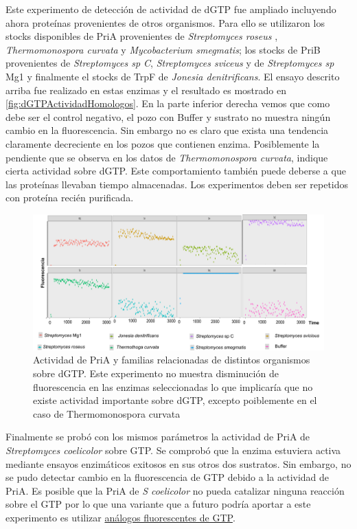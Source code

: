 \documentclass[12pt,twoside]{reedthesis}
\begin{document}
  Este experimento de detección de actividad de dGTP fue ampliado
  incluyendo ahora proteínas provenientes de otros organismos. Para ello
  se utilizaron los stocks disponibles de PriA provenientes de
  \emph{Streptomyces roseus} , \emph{Thermomonospora curvata} y
  \emph{Mycobacterium smegmatis}; los stocks de PriB provenientes de
  \emph{Streptomyces sp C}, \emph{Streptomyces sviceus} y de
  \emph{Streptomyces sp} Mg1 y finalmente el stocks de TrpF de
  \emph{Jonesia denitrificans}. El ensayo descrito arriba fue realizado en
  estas enzimas y el resultado es mostrado en
  \autoref{fig:dGTPActividadHomologos}. En la parte inferior derecha vemos
  que como debe ser el control negativo, el pozo con Buffer y sustrato no
  muestra ningún cambio en la fluorescencia. Sin embargo no es claro que
  exista una tendencia claramente decreciente en los pozos que contienen
  enzima. Posiblemente la pendiente que se observa en los datos de
  \emph{Thermomonospora curvata}, indique cierta actividad sobre dGTP.
  Este comportamiento también puede deberse a que las proteínas llevaban
  tiempo almacenadas. Los experimentos deben ser repetidos con proteína
  recién purificada.
  
  \begin{figure}[h!tbp]
  \centering
  \includegraphics[angle = 0,scale = 0.6]{chapter4/GTPCinetica.png}
  \caption[Homólogos de PriA y familias relacionadas no muestran actividad clara sobre dGTP]{\footnotesize{Actividad de PriA y familias relacionadas de distintos organismos sobre dGTP. Este experimento no muestra disminución de fluorescencia en las enzimas seleccionadas lo que implicaría que no existe actividad importante sobre dGTP, excepto poiblemente en el caso de {Thermomonospora} {curvata}}}
  \label{fig:dGTPActividadHomologos}
  \end{figure}
  
  Finalmente se probó con los mismos parámetros la actividad de PriA de
  \emph{Streptomyces coelicolor} sobre GTP. Se comprobó que la enzima
  estuviera activa mediante ensayos enzimáticos exitosos en sus otros dos
  sustratos. Sin embargo, no se pudo detectar cambio en la fluorescencia
  de GTP debido a la actividad de PriA. Es posible que la PriA de \emph{S
  coelicolor} no pueda catalizar ninguna reacción sobre el GTP por lo que
  una variante que a futuro podría aportar a este experimento es utilizar
  \href{https://www.jenabioscience.com/nucleotides-nucleosides/nucleotides-by-structure/fluorescent-nucleotides/guanosines-intrinsically-fluorescent}{análogos
  fluorescentes de GTP}.
  
\end{document}
